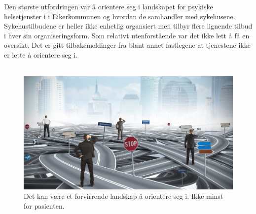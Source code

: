 \documentclass[11pt]{report} %
\begin{document}
                    Den største utfordringen var å orientere seg i landskapet for psykiske helsetjenster i i Eikerkommunen og hvordan de samhandler med sykehusene. Sykehustilbudene er heller ikke enhetlig organsiert men tilbyr flere lignende tilbud i hver sin organiseringsform. Som relativt utenforstående var det ikke lett å få en oversikt. Det er gitt tilbakemeldinger fra blant annet fastlegene at tjenestene ikke er lette å orientere seg i. \\ 
                    \\

                    \begin{figure}[ht]
                      \centering
                      \includegraphics{./pix/kaotiskvei.jpg}%
                      \caption[Framstilling av tjenestetilbudene]%
                      {Det kan være et forvirrende landskap å orientere seg i. Ikke minst for pasienten.\cite{shutter}}
                    \end{figure}    
\end{document}
